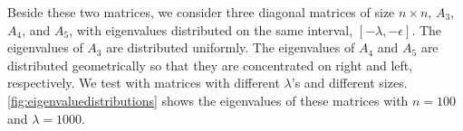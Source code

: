 Beside these two matrices, we consider three diagonal matrices of size
$n \times n$, $A_3$, $A_4$, and $A_5$, with eigenvalues distributed on the same
interval, $[-\lambda, -\epsilon]$. The eigenvalues of $A_3$ are distributed
uniformly. The eigenvalues of $A_4$ and $A_5$ are distributed geometrically so that
they are concentrated on right and left, respectively. We test with matrices with
different $\lambda$'s and different sizes.
\autoref{fig:eigenvaluedistributions} shows the eigenvalues of these matrices with
$n=100$ and $\lambda = 1000$.

